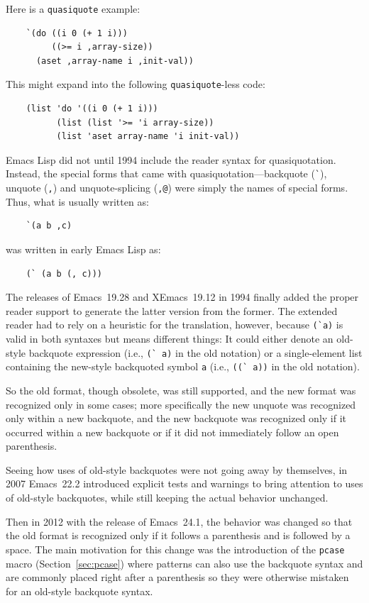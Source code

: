 \documentclass[format=acmsmall,screen]{acmart}
\newcommand \Elisp {Emacs Lisp}
\begin{document}
Here is a \texttt{quasiquote} example:
%
\begin{verbatim}
    `(do ((i 0 (+ 1 i)))
         ((>= i ,array-size))
      (aset ,array-name i ,init-val))
\end{verbatim}
%
This might expand into the following \texttt{quasiquote}-less code:
%
\begin{verbatim}
    (list 'do '((i 0 (+ 1 i)))
          (list (list '>= 'i array-size))
          (list 'aset array-name 'i init-val))
\end{verbatim}
%
\Elisp{} did not until 1994 include the reader syntax for
quasiquotation.
Instead, the special forms that came with quasiquotation---backquote
(\verb|`|), unquote (\verb|,|) and unquote-splicing (\verb|,@|) were
simply the names of special forms.   Thus, what is usually written as:
\begin{verbatim}
    `(a b ,c)
\end{verbatim}
was written in early \Elisp{} as:
\begin{verbatim}
    (` (a b (, c)))
\end{verbatim}
The releases of Emacs~19.28 and XEmacs~19.12 in 1994 finally added the
proper reader support to generate the latter version from the former.
The extended reader had to rely on a heuristic for the translation, however,
because \verb|(`a)| is valid in both syntaxes but means different
things: It could either denote an old-style backquote expression
(i.e., \verb|(` a)| in the old notation) or a single-element list containing
the new-style backquoted symbol \texttt{a} (i.e., \verb|((` a))| in the old
notation).

So the old format, though obsolete, was still supported, and the
new format was recognized only in some cases; more specifically the new
unquote was recognized only within a new backquote, and the new
backquote was recognized only if it occurred within a new backquote or
if it did not immediately follow an open parenthesis.

Seeing how uses of old-style backquotes were not going away by themselves,
in 2007
Emacs~22.2 introduced explicit tests and warnings to bring attention to uses
of old-style backquotes, while still keeping the actual behavior unchanged.

Then in 2012 with the release of Emacs~24.1, the behavior was changed so
that the old format is recognized only if it follows a parenthesis and is
followed by a space.  The main motivation for this change was the
introduction of the \texttt{pcase} macro (Section~\ref{sec:pcase}) where
patterns can also use the
backquote syntax and are commonly placed right after a parenthesis so they
were otherwise mistaken for an old-style backquote syntax.
\end{document}
